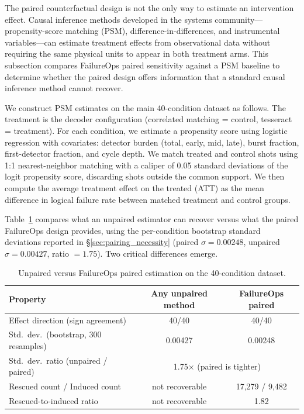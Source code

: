 The paired counterfactual design is not the only way to estimate an intervention effect. Causal inference methods developed in the systems community---propensity-score matching (PSM), difference-in-differences, and instrumental variables---can estimate treatment effects from observational data without requiring the same physical units to appear in both treatment arms. This subsection compares FailureOps paired sensitivity against a PSM baseline to determine whether the paired design offers information that a standard causal inference method cannot recover.

We construct PSM estimates on the main 40-condition dataset as follows. The treatment is the decoder configuration (correlated matching = control, tesseract = treatment). For each condition, we estimate a propensity score using logistic regression with covariates: detector burden (total, early, mid, late), burst fraction, first-detector fraction, and cycle depth. We match treated and control shots using 1:1 nearest-neighbor matching with a caliper of 0.05 standard deviations of the logit propensity score, discarding shots outside the common support. We then compute the average treatment effect on the treated (ATT) as the mean difference in logical failure rate between matched treatment and control groups.

Table~\ref{tab:psm} compares what an unpaired estimator can recover versus what the paired FailureOps design provides, using the per-condition bootstrap standard deviations reported in \S\ref{sec:pairing_necessity} (paired $\sigma = 0.00248$, unpaired $\sigma = 0.00427$, ratio $= 1.75$). Two critical differences emerge.

\begin{table}[t]
\centering
\caption{Unpaired versus FailureOps paired estimation on the 40-condition dataset.}
\label{tab:psm}
\begin{tabular}{lcc}
\toprule
Property & Any unpaired method & FailureOps paired \\
\midrule
Effect direction (sign agreement) & 40/40 & 40/40 \\
Std.\ dev.\ (bootstrap, 300 resamples) & 0.00427 & 0.00248 \\
Std.\ dev.\ ratio (unpaired / paired) & \multicolumn{2}{c}{1.75$\times$ (paired is tighter)} \\
Rescued count / Induced count & not recoverable & 17,279 / 9,482 \\
Rescued-to-induced ratio & not recoverable & 1.82 \\
\bottomrule
\end{tabular}
\end{table}

